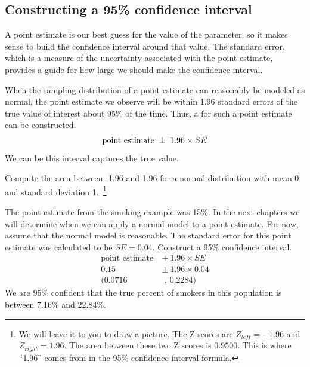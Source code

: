 \subsection{Constructing a 95\% confidence interval}

A point estimate is our best guess for the value of the parameter, so it makes sense to build the confidence interval around that value. The standard error, which is a measure of the uncertainty associated with the point estimate, provides a guide for how large we should make the confidence interval.

\begin{termBox}{
When the sampling distribution of a point estimate can reasonably be modeled as normal, the point estimate we observe will be within 1.96 standard errors of the true value of interest about 95\% of the time. Thus, a  for such a point estimate can be constructed:\vspace{-2mm}
\begin{align}
\text{point estimate}\ \pm\ 1.96 \times SE\vspace{-2mm}
\label{95PercentConfidenceIntervalFormula}
\end{align}
We can be  this interval captures the true value.}
\end{termBox}

\begin{exercise}
Compute the area between -1.96 and 1.96 for a normal distribution with mean 0 and standard deviation 1.~\footnote{We will leave it to you to draw a picture. The Z scores are $Z_{left} = -1.96$ and $Z_{right} = 1.96$. The area between these two Z scores is $0.9500$. This is where ``1.96'' comes from in the 95\% confidence interval formula.}
\end{exercise}

\begin{example}{The point estimate from the smoking example was 15\%. In the next chapters we will determine when we can apply a normal model to a point estimate. For now, assume that the normal model is reasonable. The standard error for this point estimate was calculated to be $SE = 0.04$. Construct a 95\% confidence interval.}
\begin{align*}
\text{point estimate}\ &\pm \ 1.96\times SE \\
0.15\  &\pm \ 1.96\times 0.04\\
(0.0716&\text{ , } 0.2284)
\end{align*}
We are 95\% confident that the true percent of smokers in this population is between 7.16\% and 22.84\%.
\end{example}

